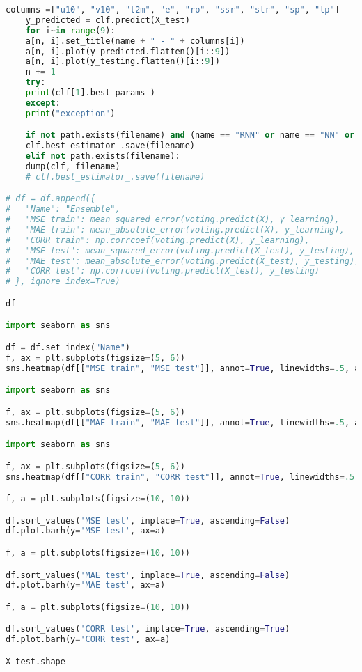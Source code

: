 \begin{lstlisting}[label=python-listing,caption={Kod źródłowy},language=python]
    columns =["u10", "v10", "t2m", "e", "ro", "ssr", "str", "sp", "tp"]
    y_predicted = clf.predict(X_test)
    for i~in range(9):
    a[n, i].set_title(name + " - " + columns[i])
    a[n, i].plot(y_predicted.flatten()[i::9])
    a[n, i].plot(y_testing.flatten()[i::9])
    n += 1
    try:
    print(clf[1].best_params_)
    except:
    print("exception")

    if not path.exists(filename) and (name == "RNN" or name == "NN" or name == "CNN"):
    clf.best_estimator_.save(filename)
    elif not path.exists(filename):
    dump(clf, filename)
    # clf.best_estimator_.save(filename)

# df = df.append({
#   "Name": "Ensemble",
#   "MSE train": mean_squared_error(voting.predict(X), y_learning),
#   "MAE train": mean_absolute_error(voting.predict(X), y_learning),
#   "CORR train": np.corrcoef(voting.predict(X), y_learning),
#   "MSE test": mean_squared_error(voting.predict(X_test), y_testing),
#   "MAE test": mean_absolute_error(voting.predict(X_test), y_testing),
#   "CORR test": np.corrcoef(voting.predict(X_test), y_testing)
# }, ignore_index=True)

df

import seaborn as sns

df = df.set_index("Name")
f, ax = plt.subplots(figsize=(5, 6))
sns.heatmap(df[["MSE train", "MSE test"]], annot=True, linewidths=.5, ax=ax, cmap="Blues")

import seaborn as sns

f, ax = plt.subplots(figsize=(5, 6))
sns.heatmap(df[["MAE train", "MAE test"]], annot=True, linewidths=.5, ax=ax, cmap="Blues")

import seaborn as sns

f, ax = plt.subplots(figsize=(5, 6))
sns.heatmap(df[["CORR train", "CORR test"]], annot=True, linewidths=.5, ax=ax, cmap="Blues")

f, a = plt.subplots(figsize=(10, 10))

df.sort_values('MSE test', inplace=True, ascending=False)
df.plot.barh(y='MSE test', ax=a)

f, a = plt.subplots(figsize=(10, 10))

df.sort_values('MAE test', inplace=True, ascending=False)
df.plot.barh(y='MAE test', ax=a)

f, a = plt.subplots(figsize=(10, 10))

df.sort_values('CORR test', inplace=True, ascending=True)
df.plot.barh(y='CORR test', ax=a)

X_test.shape


\end{lstlisting}
